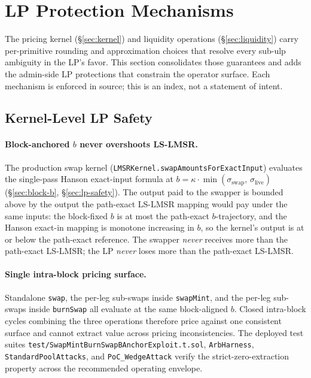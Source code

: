 \documentclass[11pt]{article}
\begin{document}
\section{LP Protection Mechanisms}
\label{sec:lp-protections}

The pricing kernel (\S\ref{sec:kernel}) and liquidity operations
(\S\ref{sec:liquidity}) carry per-primitive rounding and approximation
choices that resolve every sub-ulp ambiguity in the LP's favor. This
section consolidates those guarantees and adds the admin-side LP
protections that constrain the operator surface. Each mechanism is
enforced in source; this is an index, not a statement of intent.

\subsection{Kernel-Level LP Safety}

\paragraph{Block-anchored $b$ never overshoots LS-LMSR.}
The production swap kernel
(\texttt{LMSRKernel.\allowbreak swapAmountsForExactInput}) evaluates
the single-pass Hanson exact-input formula at $b = \kappa \cdot
\min(\sigma_{\mathrm{swap}},\,\sigma_{\mathrm{live}})$
(\S\ref{sec:block-b}, \S\ref{sec:lp-safety}). The output paid to the
swapper is bounded above by the output the path-exact LS-LMSR mapping
would pay under the same inputs: the block-fixed $b$ is at most the
path-exact $b$-trajectory, and the Hanson exact-in mapping is
monotone increasing in $b$, so the kernel's output is at or below the
path-exact reference. The swapper \emph{never} receives more than the
path-exact LS-LMSR; the LP \emph{never} loses more than the path-exact
LS-LMSR.

\paragraph{Single intra-block pricing surface.}
Standalone \texttt{swap}, the per-leg sub-swaps inside
\texttt{swapMint}, and the per-leg sub-swaps inside \texttt{burnSwap}
all evaluate at the same block-aligned $b$. Closed intra-block cycles
combining the three operations therefore price against one consistent
surface and cannot extract value across pricing inconsistencies. The
deployed test suites \texttt{test/SwapMintBurnSwapBAnchorExploit.t.sol},
\texttt{ArbHarness}, \texttt{StandardPoolAttacks}, and
\texttt{PoC\_WedgeAttack} verify the strict-zero-extraction property
across the recommended operating envelope.
\end{document}
